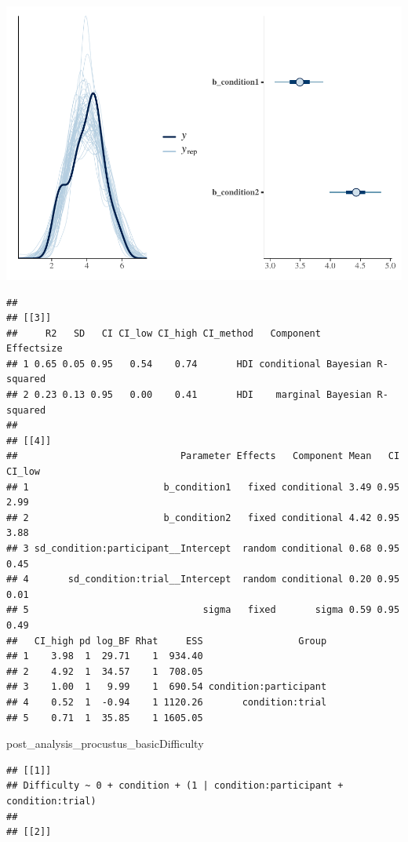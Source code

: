 \documentclass[
]{article}
\newenvironment{Shaded}{\begin{snugshade}}{\end{snugshade}}
\newcommand{\NormalTok}[1]{#1}
\begin{document}
\includegraphics{08_Publish_GUSO_ASIL_files/figure-latex/DiagnosticsQ-3.pdf}

\begin{verbatim}
## 
## [[3]]
##     R2   SD   CI CI_low CI_high CI_method   Component         Effectsize
## 1 0.65 0.05 0.95   0.54    0.74       HDI conditional Bayesian R-squared
## 2 0.23 0.13 0.95   0.00    0.41       HDI    marginal Bayesian R-squared
## 
## [[4]]
##                             Parameter Effects   Component Mean   CI CI_low
## 1                        b_condition1   fixed conditional 3.49 0.95   2.99
## 2                        b_condition2   fixed conditional 4.42 0.95   3.88
## 3 sd_condition:participant__Intercept  random conditional 0.68 0.95   0.45
## 4       sd_condition:trial__Intercept  random conditional 0.20 0.95   0.01
## 5                               sigma   fixed       sigma 0.59 0.95   0.49
##   CI_high pd log_BF Rhat     ESS                 Group
## 1    3.98  1  29.71    1  934.40                      
## 2    4.92  1  34.57    1  708.05                      
## 3    1.00  1   9.99    1  690.54 condition:participant
## 4    0.52  1  -0.94    1 1120.26       condition:trial
## 5    0.71  1  35.85    1 1605.05
\end{verbatim}

\begin{Shaded}
\begin{Highlighting}[]
\NormalTok{post\_analysis\_procustus\_basicDifficulty}
\end{Highlighting}
\end{Shaded}

\begin{verbatim}
## [[1]]
## Difficulty ~ 0 + condition + (1 | condition:participant + condition:trial) 
## 
## [[2]]
\end{verbatim}
\end{document}
